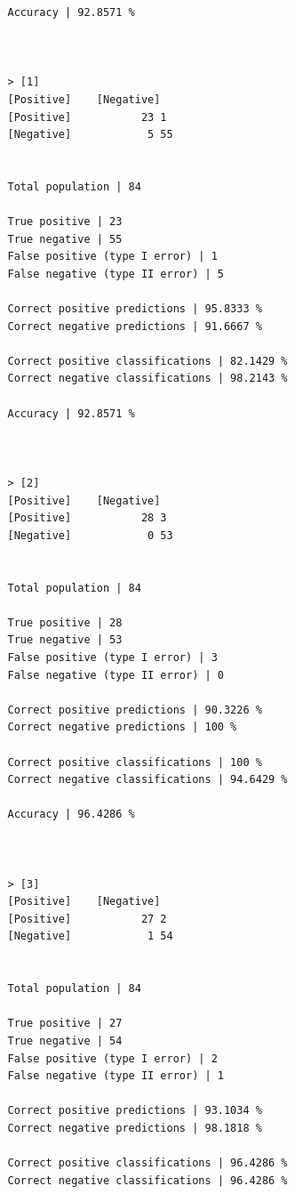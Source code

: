 \documentclass{classrep}
\begin{document}
{{{\begin{lstlisting}
                Accuracy | 92.8571 %



                > [1]
                [Positive]    [Negative]
                [Positive]           23 1
                [Negative]            5 55


                Total population | 84

                True positive | 23
                True negative | 55
                False positive (type I error) | 1
                False negative (type II error) | 5

                Correct positive predictions | 95.8333 %
                Correct negative predictions | 91.6667 %

                Correct positive classifications | 82.1429 %
                Correct negative classifications | 98.2143 %

                Accuracy | 92.8571 %



                > [2]
                [Positive]    [Negative]
                [Positive]           28 3
                [Negative]            0 53


                Total population | 84

                True positive | 28
                True negative | 53
                False positive (type I error) | 3
                False negative (type II error) | 0

                Correct positive predictions | 90.3226 %
                Correct negative predictions | 100 %

                Correct positive classifications | 100 %
                Correct negative classifications | 94.6429 %

                Accuracy | 96.4286 %



                > [3]
                [Positive]    [Negative]
                [Positive]           27 2
                [Negative]            1 54


                Total population | 84

                True positive | 27
                True negative | 54
                False positive (type I error) | 2
                False negative (type II error) | 1

                Correct positive predictions | 93.1034 %
                Correct negative predictions | 98.1818 %

                Correct positive classifications | 96.4286 %
                Correct negative classifications | 96.4286 %


\end{lstlisting}}}}
\end{document}
